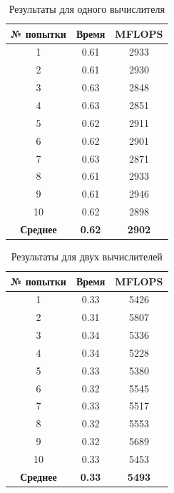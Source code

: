 \begin{table}[H]
	\caption{Результаты для одного вычислителя}
	\centering
	\begin{tabular}{|c|c|c|}
		\hline
\textbf{№ попытки} & \textbf{Время} & \textbf{MFLOPS} \\ \hline
		1  & 0.61 & 2933 \\ \hline
		2  & 0.61 & 2930 \\ \hline
		3  & 0.63 & 2848 \\ \hline
		4  & 0.63 & 2851 \\ \hline
		5  & 0.62 & 2911 \\ \hline
		6  & 0.62 & 2901 \\ \hline
		7  & 0.63 & 2871 \\ \hline
		8  & 0.61 & 2933 \\ \hline
		9  & 0.61 & 2946 \\ \hline
		10 & 0.62 & 2898 \\ \hline
\textbf{Среднее} & \textbf{0.62} & \textbf{2902} \\
		\hline
	\end{tabular}
	\label{res/01}
\end{table}


\begin{table}[H]
	\caption{Результаты для двух вычислителей}
	\centering
	\begin{tabular}{|c|c|c|}
		\hline
		\textbf{№ попытки} & \textbf{Время} & \textbf{MFLOPS} \\\hline
		1 & 0.33 & 5426 \\ \hline
		2 & 0.31 & 5807 \\ \hline
		3 & 0.34 & 5336 \\ \hline
		4 & 0.34 & 5228 \\ \hline
		5 & 0.33 & 5380 \\ \hline
		6 & 0.32 & 5545 \\ \hline
		7 & 0.33 & 5517 \\ \hline
		8 & 0.32 & 5553 \\ \hline
		9 & 0.32 & 5689 \\ \hline
		10 & 0.33 & 5453 \\ \hline
		\textbf{Среднее} & \textbf{0.33} & \textbf{5493} \\\hline
	\end{tabular}
	\label{res/02}
\end{table}


